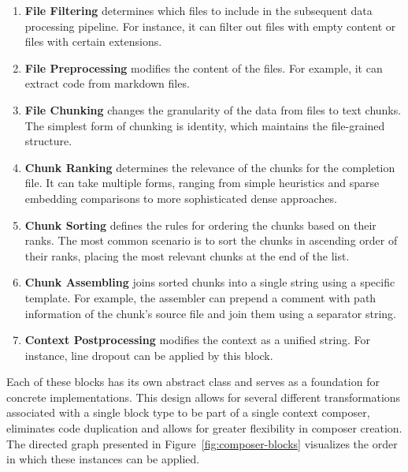 \begin{enumerate}
    \item \textbf{File Filtering} determines which files to include in the subsequent data processing pipeline. For instance, it can filter out files with empty content or files with certain extensions.
    \item \textbf{File Preprocessing} modifies the content of the files. For example, it can extract code from markdown files.
    \item \textbf{File Chunking} changes the granularity of the data from files to text chunks. The simplest form of chunking is identity, which maintains the file-grained structure.
    \item \textbf{Chunk Ranking} determines the relevance of the chunks for the completion file. It can take multiple forms, ranging from simple heuristics and sparse embedding comparisons to more sophisticated dense approaches.
    \item \textbf{Chunk Sorting} defines the rules for ordering the chunks based on their ranks. The most common scenario is to sort the chunks in ascending order of their ranks, placing the most relevant chunks at the end of the list.
    \item \textbf{Chunk Assembling} joins sorted chunks into a single string using a specific template. For example, the assembler can prepend a comment with path information of the chunk's source file and join them using a separator string.
    \item \textbf{Context Postprocessing} modifies the context as a unified string. For instance, line dropout can be applied by this block.
\end{enumerate}

Each of these blocks has its own abstract class and serves as a foundation for concrete implementations. This design allows for several different transformations associated with a single block type to be part of a single context composer, eliminates code duplication and allows for greater flexibility in composer creation. The directed graph presented in Figure~\ref{fig:composer-blocks} visualizes the order in which these instances can be applied.

